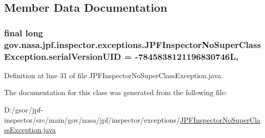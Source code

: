 \subsection{Member Data Documentation}
\subsubsection[{\texorpdfstring{serial\+Version\+U\+ID}{serialVersionUID}}]{\setlength{\rightskip}{0pt plus 5cm}final long gov.\+nasa.\+jpf.\+inspector.\+exceptions.\+J\+P\+F\+Inspector\+No\+Super\+Class\+Exception.\+serial\+Version\+U\+ID = -\/7845838121196830746L\hspace{0.3cm}{\ttfamily [static]}, {\ttfamily [private]}}\hypertarget{classgov_1_1nasa_1_1jpf_1_1inspector_1_1exceptions_1_1_j_p_f_inspector_no_super_class_exception_a551734f8064f0a2d3fbf2a974745a20e}{}\label{classgov_1_1nasa_1_1jpf_1_1inspector_1_1exceptions_1_1_j_p_f_inspector_no_super_class_exception_a551734f8064f0a2d3fbf2a974745a20e}


Definition at line 31 of file J\+P\+F\+Inspector\+No\+Super\+Class\+Exception.\+java.



The documentation for this class was generated from the following file\+:\begin{DoxyCompactItemize}
\item 
D\+:/gsoc/jpf-\/inspector/src/main/gov/nasa/jpf/inspector/exceptions/\hyperlink{_j_p_f_inspector_no_super_class_exception_8java}{J\+P\+F\+Inspector\+No\+Super\+Class\+Exception.\+java}\end{DoxyCompactItemize}
